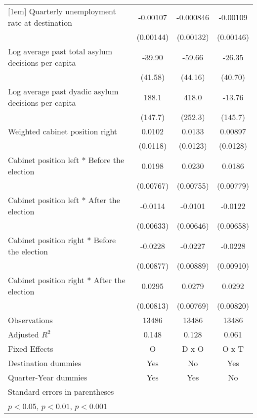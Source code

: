 \begin{table}[htbp]
\begin{tabular}{l*{3}{c}}
[1em]
Quarterly unemployment rate at destination&    -0.00107         &   -0.000846         &    -0.00109         \\
                    &   (0.00144)         &   (0.00132)         &   (0.00146)         \\
[1em]
Log average past total asylum decisions per capita&      -39.90         &      -59.66         &      -26.35         \\
                    &     (41.58)         &     (44.16)         &     (40.70)         \\
[1em]
Log average past dyadic asylum decisions per capita&       188.1         &       418.0         &      -13.76         \\
                    &     (147.7)         &     (252.3)         &     (145.7)         \\
[1em]
Weighted cabinet position right&      0.0102         &      0.0133         &     0.00897         \\
                    &    (0.0118)         &    (0.0123)         &    (0.0128)         \\
[1em]
Cabinet position left * Before the election&      0.0198\sym{*}  &      0.0230\sym{**} &      0.0186\sym{*}  \\
                    &   (0.00767)         &   (0.00755)         &   (0.00779)         \\
[1em]
Cabinet position left * After the election&     -0.0114         &     -0.0101         &     -0.0122         \\
                    &   (0.00633)         &   (0.00646)         &   (0.00658)         \\
[1em]
Cabinet position right * Before the election&     -0.0228\sym{*}  &     -0.0227\sym{*}  &     -0.0228\sym{*}  \\
                    &   (0.00877)         &   (0.00889)         &   (0.00910)         \\
[1em]
Cabinet position right * After the election&      0.0295\sym{***}&      0.0279\sym{***}&      0.0292\sym{***}\\
                    &   (0.00813)         &   (0.00769)         &   (0.00820)         \\
\hline
Observations        &       13486         &       13486         &       13486         \\
Adjusted \(R^{2}\)  &       0.148         &       0.128         &       0.061         \\
Fixed Effects       &           O         &       D x O         &       O x T         \\
Destination dummies &         Yes         &          No         &         Yes         \\
Quarter-Year dummies&         Yes         &         Yes         &          No         \\
\hline\hline
\multicolumn{4}{l}{\footnotesize Standard errors in parentheses}\\
\multicolumn{4}{l}{\footnotesize \sym{*} \(p<0.05\), \sym{**} \(p<0.01\), \sym{***} \(p<0.001\)}\\
\end{tabular}
\end{table}
